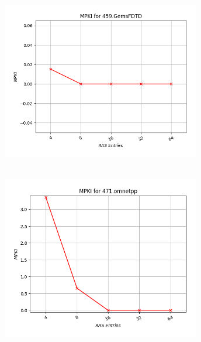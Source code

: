    \begin{minipage}{\textwidth}
      \begin{center}
         \\
         \vspace{3mm}
         \includegraphics[width=0.65\textwidth, frame]{./graphs/4-4/459-GemsFDTD.png}
         \vspace{6mm}
      \end{center}
   \end{minipage}

   \begin{minipage}{\textwidth}
      \begin{center}
         \\
         \vspace{3mm}
         \includegraphics[width=0.65\textwidth, frame]{./graphs/4-4/471-omnetpp.png}
         \vspace{6mm}
      \end{center}
   \end{minipage}

